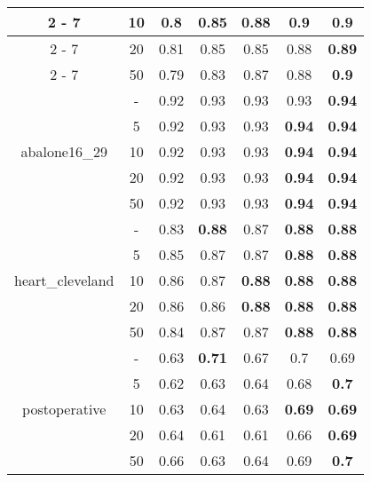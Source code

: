 \documentclass{article}%
\begin{document}
\begin{longtable}{c|c|ccccc}
\cline{2%
-%
7}%
&10&0.8&0.85&0.88&\textbf{0.9}&\textbf{0.9}\\%
\cline{2%
-%
7}%
&20&0.81&0.85&0.85&0.88&\textbf{0.89}\\%
\cline{2%
-%
7}%
&50&0.79&0.83&0.87&0.88&\textbf{0.9}\\%
\hline%
\multirow{5}{*}{abalone16\_29}&{-}&0.92&0.93&0.93&0.93&\textbf{0.94}\\%
\cline{2%
-%
7}%
&5&0.92&0.93&0.93&\textbf{0.94}&\textbf{0.94}\\%
\cline{2%
-%
7}%
&10&0.92&0.93&0.93&\textbf{0.94}&\textbf{0.94}\\%
\cline{2%
-%
7}%
&20&0.92&0.93&0.93&\textbf{0.94}&\textbf{0.94}\\%
\cline{2%
-%
7}%
&50&0.92&0.93&0.93&\textbf{0.94}&\textbf{0.94}\\%
\hline%
\multirow{5}{*}{heart\_cleveland}&{-}&0.83&\textbf{0.88}&0.87&\textbf{0.88}&\textbf{0.88}\\%
\cline{2%
-%
7}%
&5&0.85&0.87&0.87&\textbf{0.88}&\textbf{0.88}\\%
\cline{2%
-%
7}%
&10&0.86&0.87&\textbf{0.88}&\textbf{0.88}&\textbf{0.88}\\%
\cline{2%
-%
7}%
&20&0.86&0.86&\textbf{0.88}&\textbf{0.88}&\textbf{0.88}\\%
\cline{2%
-%
7}%
&50&0.84&0.87&0.87&\textbf{0.88}&\textbf{0.88}\\%
\hline%
\multirow{5}{*}{postoperative}&{-}&0.63&\textbf{0.71}&0.67&0.7&0.69\\%
\cline{2%
-%
7}%
&5&0.62&0.63&0.64&0.68&\textbf{0.7}\\%
\cline{2%
-%
7}%
&10&0.63&0.64&0.63&\textbf{0.69}&\textbf{0.69}\\%
\cline{2%
-%
7}%
&20&0.64&0.61&0.61&0.66&\textbf{0.69}\\%
\cline{2%
-%
7}%
&50&0.66&0.63&0.64&0.69&\textbf{0.7}\\%
\hline%
\end{longtable}

%
\end{document}
